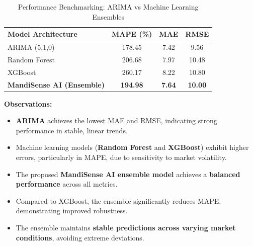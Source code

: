 \documentclass[12pt,a4paper]{report}
\begin{document}
\vspace{0.8em}

\begin{table}[H]
\centering
\caption{\small Performance Benchmarking: ARIMA vs Machine Learning Ensembles}
\label{tab:model_comparison}

\vspace{0.4em}

\renewcommand{\arraystretch}{1.3}
\setlength{\tabcolsep}{10pt}

\begin{tabular}{|l|c|c|c|}
\hline
\textbf{Model Architecture} & \textbf{MAPE (\%)} & \textbf{MAE} & \textbf{RMSE} \\
\hline
ARIMA (5,1,0) & 178.45 & 7.42 & 9.56 \\
Random Forest & 206.68 & 7.97 & 10.48 \\
XGBoost & 260.17 & 8.22 & 10.80 \\
\hline
\rowcolor{gray!10}
\textbf{MandiSense AI (Ensemble)} & \textbf{194.98} & \textbf{7.64} & \textbf{10.00} \\
\hline
\end{tabular}
\end{table}

\vspace{0.8em}

\noindent
\textbf{Observations:}
\vspace{0.3em}

\begin{itemize}
    \item \textbf{ARIMA} achieves the lowest MAE and RMSE, indicating strong performance in stable, linear trends.
    
    \item Machine learning models (\textbf{Random Forest} and \textbf{XGBoost}) exhibit higher errors, particularly in MAPE, due to sensitivity to market volatility.
    
    \item The proposed \textbf{MandiSense AI ensemble model} achieves a \textbf{balanced performance} across all metrics.
    
    \item Compared to XGBoost, the ensemble significantly reduces MAPE, demonstrating improved robustness.
    
    \item The ensemble maintains \textbf{stable predictions across varying market conditions}, avoiding extreme deviations.
\end{itemize}
\end{document}
